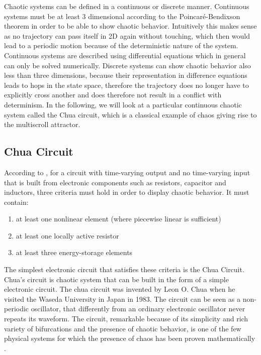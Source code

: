\documentclass[main]{subfiles}
\begin{document}
Chaotic systems can be defined in a continuous or discrete manner. Continuous systems must be at least 3 dimensional according to the Poincaré-Bendixson theorem in order to be able to show chaotic behavior. Intuitively this makes sense as no trajectory can pass itself in 2D again without touching, which then would lead to a periodic motion because of the deterministic nature of the system. Continuous systems are described using differential equations which in general can only be solved numerically. Discrete systems can show chaotic behavior also less than three dimensions, because their representation in difference equations leads to hops in the state space, therefore the trajectory does no longer have to explicitly cross another and does therefore not result in a conflict with determinism. In the following, we will look at a particular continuous chaotic system called the Chua circuit, which is a classical example of chaos giving rise to the multiscroll attractor.

\subsection{Chua Circuit}
\label{subsec:chua-circuit}

According to \cite{bib:Kennedy1993}, for a circuit with time-varying output and no time-varying input that is built from electronic components such as resistors, capacitor and inductors, three criteria must hold in order to display chaotic behavior. It must contain:
\begin{enumerate}
  \item at least one nonlinear element (where piecewise linear is sufficient)
  \item at least one locally active resistor
  \item at least three energy-storage elements
\end{enumerate}
  
The simplest electronic circuit that satisfies these criteria is the Chua Circuit. Chua's circuit is chaotic system that can be built in the form of a simple electronic circuit. The chua circuit was invented by Leon O. Chua when he visited the Waseda University in Japan in 1983. The circuit can be seen as a non-periodic oscillator, that differently from an ordinary electronic oscillator never repeats its waveform. The circuit, remarkable because of its simplicity and rich variety of bifurcations and the presence of chaotic behavior, is one of the few physical systems for which the presence of chaos has been proven mathematically \cite{bib:Kennedy1993}.
\end{document}

